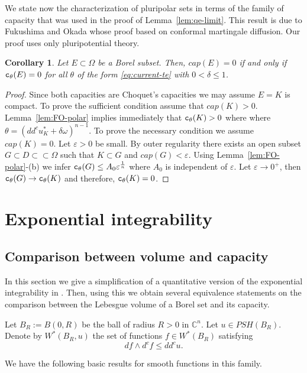 \documentclass{amsart}
\newcommand{\veps}{\varepsilon}
\newcommand{\de}{\delta}
\newcommand{\om}{\omega}
\newcommand{\te}{\theta}
\newcommand{\tc}{{\tt c}}
\newcommand{\Om}{\Omega}
\newcommand{\bC}{\mathbb{C}}
\newtheorem{cor}[thm]{Corollary}
\theoremstyle{definition}
\numberwithin{thm}{section}
\numberwithin{equation}{section}
\renewcommand{\[}{\begin{equation}}
\renewcommand{\]}{\end{equation}}
\newcommand{\wed}{\wedge}
\begin{document}
We state now the characterization of pluripolar sets in terms of the family of capacity that was used in the proof of Lemma~\ref{lem:qe-limit}.  This result is due to Fukushima and Okada \cite{FO84} whose proof based on conformal martingale diffusion. Our proof uses only pluripotential theory.

\begin{cor} \label{cor:FO-polar}
Let $E\subset \Om$ be a Borel subset. Then, $cap (E) =0$ if  and only if $\tc_\te(E) =0$ for all $\te $ of the form \eqref{eq:current-te} with $0<\de \leq 1$.
\end{cor}

\begin{proof}  Since both capacities are Choquet's capacities  we may assume $E=K$ is compact. To prove the sufficient  condition  assume that $cap (K)>0$. Lemma~\ref{lem:FO-polar} implies immediately that $\tc_\te(K)>0$ where 
where $\te = (dd^cu_K^* + \de \om)^{n-1}$. 
To prove the necessary condition we assume $cap (K) =0$. 
Let   $\veps>0$ be small. By outer regularity there exists an open subset $G\subset D \subset\subset \Om$ 
such that $K\subset G$ and $cap (G) < \veps$. Using Lemma~\ref{lem:FO-polar}-(b) we infer  $\tc_\te (G) \leq A_0 \veps^\frac{1}{n}$ where $A_0$ is  independent of $\veps$.
 Let $\veps\to 0^+$, then $\tc_\te(G) \to \tc_\te(K)$ and therefore,  $\tc_\te(K) =0$.
\end{proof}



\section{Exponential integrability}

\subsection{Comparison between volume and capacity}

In this section we give a simplification of a quantitative version of  the exponential integrability in \cite{DMV}. Then, using this we obtain several equivalence statements on the comparison between the Lebesgue volume of a Borel set and its capacity. 


Let $B_R:=B(0,R)$ be the ball of radius $R>0$ in $\bC^n$. Let $u \in PSH(B_R)$. Denote by $W^*(B_R, u)$ the set of  functions
$f \in W^*(B_R)$ satisfying
\[\label{eq:sobolev-potential} df \wed d^cf \leq dd^c u.\] 

We have the following basic results for smooth functions in this family.
\end{document}
